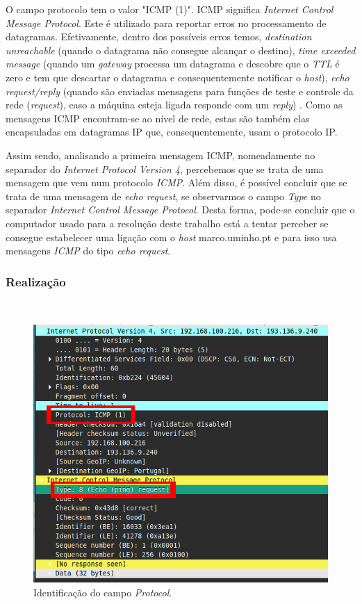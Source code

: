\documentclass{llncs}
\begin{document}
O campo protocolo tem o valor "ICMP (1)". ICMP significa \textit{Internet Control Message Protocol}. Este é utilizado para reportar erros no processamento de datagramas. Efetivamente, dentro dos possíveis erros temos, \textit{destination unreachable} (quando o datagrama não consegue alcançar o destino), \textit{time exceeded message} (quando um \textit{gateway} processa um datagrama e descobre que o \textit{TTL} é zero e tem que descartar o datagrama e consequentemente notificar o \textit{host}), \textit{echo request/reply} (quando são enviadas mensagens para funções de teste e controle da rede (\textit{request}), caso a máquina esteja ligada responde com um \textit{reply}) \cite{rfc792} \cite{wiki:ICMP_echo}. Como as mensagens ICMP encontram-se ao nível de rede, estas são também elas encapsuladas em datagramas IP que, consequentemente, usam o protocolo IP.

Assim sendo, analisando a primeira mensagem ICMP, nomeadamente no separador do \textit{Internet Protocol Version 4}, percebemos que se trata de uma mensagem que vem num protocolo \textit{ICMP}. Além disso, é possível concluir que se trata de uma mensagem de \textit{echo request}, se observarmos o campo \textit{Type} no separador \textit{Internet Control Message Protocol}. Desta forma, pode-se concluir que o computador usado para a resolução deste trabalho está a tentar perceber se consegue estabelecer uma ligação com o \textit{host} marco.uminho.pt e para isso usa mensagens \textit{ICMP} do tipo \textit{echo request}.

\subsubsection{Realização}\rule[-10pt]{0pt}{10pt}\\
\begin{figure}
	\begin{center}
	\includegraphics[scale=0.35]{./imagens/icmp_1.png} 
	\end{center}
	\caption{\label{fig:icmp_1}Identificação do campo \textit{Protocol}.}
\end{figure} 
\end{document}
